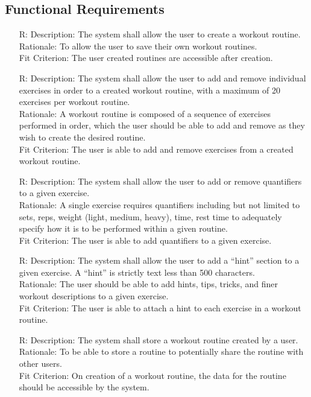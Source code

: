 \documentclass[12pt]{article}
\newcounter{reqnum} %
\begin{document}
\subsection{Functional Requirements}
\noindent \begin{itemize}

\item[R\refstepcounter{reqnum}\thereqnum \label{R_Inputs}:]
Description: The system shall allow the user to create a workout routine.
\\ Rationale: To allow the user to save their own workout routines.
\\ Fit Criterion: The user created routines are accessible after creation.

\item[R\refstepcounter{reqnum}\thereqnum \label{R_Inputs}:]
Description: The system shall allow the user to add and remove individual exercises in order to a created workout routine, with a maximum of 20 exercises per workout routine.
\\ Rationale: A workout routine is composed of a sequence of exercises performed in order, which the user should be able to add and remove as they wish to create the desired routine.
\\ Fit Criterion: The user is able to add and remove exercises from a created workout routine.

\item[R\refstepcounter{reqnum}\thereqnum \label{R_Inputs}:]
Description: The system shall allow the user to add or remove quantifiers to a given exercise.
\\ Rationale: A single exercise requires quantifiers including but not limited to sets, reps, weight (light, medium, heavy), time, rest time to adequately specify how it is to be performed within a given routine.
\\ Fit Criterion: The user is able to add quantifiers to a given exercise.

\item[R\refstepcounter{reqnum}\thereqnum \label{R_Inputs}:]
Description: The system shall allow the user to add a ``hint'' section to a given exercise. A ``hint'' is strictly text less than 500 characters.
\\ Rationale: The user should be able to add hints, tips, tricks, and finer workout descriptions to a given exercise.
\\ Fit Criterion: The user is able to attach a hint to each exercise in a workout routine.

\item[R\refstepcounter{reqnum}\thereqnum \label{R_Inputs}:]
Description: The system shall store a workout routine created by a user. 
\\ Rationale: To be able to store a routine to potentially share the routine with other users.
\\ Fit Criterion: On creation of a workout routine, the data for the routine should be accessible by the system.


\end{itemize}
\end{document}
